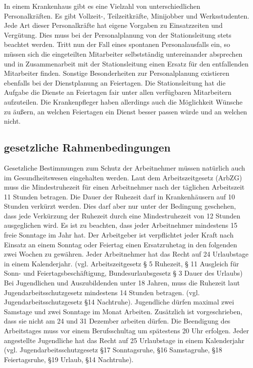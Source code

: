 \documentclass[10pt,a4paper]{article}
\begin{document}
In einem Krankenhaus gibt es eine Vielzahl von unterschiedlichen Personalkräften. Es gibt Vollzeit-, Teilzeitkräfte, Minijobber und Werksstudenten. Jede Art dieser Personalkräfte hat eigene Vorgaben zu Einsatzzeiten und Vergütung. Dies muss bei der Personalplanung von der Stationsleitung stets beachtet werden. 
Tritt nun der Fall eines spontanen Personalausfalls ein, so müssen sich die eingeteilten Mitarbeiter selbstständig untereinander absprechen und in Zusammenarbeit mit der Stationsleitung einen Ersatz für den entfallenden Mitarbeiter finden.
Sonstige Besonderheiten zur Personalplanung existieren ebenfalls bei der Dienstplanung an Feiertagen. Die Stationsleitung hat die Aufgabe die Dienste an Feiertagen fair unter allen verfügbaren Mitarbeitern aufzuteilen. Die Krankenpfleger haben allerdings auch die Möglichkeit Wünsche zu äußern, an welchen Feiertagen ein Dienst besser passen würde und an welchen nicht. 
\subsection{gesetzliche Rahmenbedingungen}
Gesetzliche Bestimmungen zum Schutz der Arbeitnehmer müssen natürlich auch im Gesundheitswesen eingehalten werden. Laut dem Arbeitszeitgesetz (ArbZG) muss die Mindestruhezeit für einen Arbeitnehmer nach der täglichen Arbeitszeit 11 Stunden betragen. Die Dauer der Ruhezeit darf in Krankenhäusern auf 10 Stunden verkürzt werden. Dies darf aber nur unter der Bedingung geschehen, dass jede Verkürzung der Ruhezeit durch eine Mindestruhezeit von 12 Stunden ausgeglichen wird. Es ist zu beachten, dass jeder Arbeitnehmer mindestens 15 freie Sonntage im Jahr hat. 
Der Arbeitgeber ist verpflichtet jeder Kraft nach Einsatz an einem Sonntag oder Feiertag einen Ersatzruhetag in den folgenden zwei Wochen zu gewähren. Jeder Arbeitnehmer hat das Recht auf 24 Urlaubstage in einem Kalenderjahr. (vgl. Arbeitszeitgesetz § 5 Ruhezeit, § 11 Ausgleich für Sonn- und Feiertagsbeschäftigung, Bundesurlaubsgesetz § 3 Dauer des Urlaubs)
Bei Jugendlichen und Auszubildenden unter 18 Jahren, muss die Ruhezeit laut Jugendarbeitsschutzgesetz mindestens 14 Stunden betragen. (vgl. Jugendarbeitsschutzgesetz §14 Nachtruhe). Jugendliche dürfen maximal zwei Samstage und zwei Sonntage im Monat Arbeiten. Zusätzlich ist vorgeschrieben, dass sie nicht am 24 und 31 Dezember arbeiten dürfen. Die Beendigung des Arbeitstages muss vor einem Berufsschultag um spätestens 20 Uhr erfolgen. Jeder angestellte Jugendliche hat das Recht auf 25 Urlaubstage in einem Kalenderjahr (vgl. Jugendarbeitsschutzgesetz §17 Sonntagsruhe, §16 Samstagruhe, §18 Feiertagsruhe, §19 Urlaub, §14 Nachtruhe).
\end{document}
